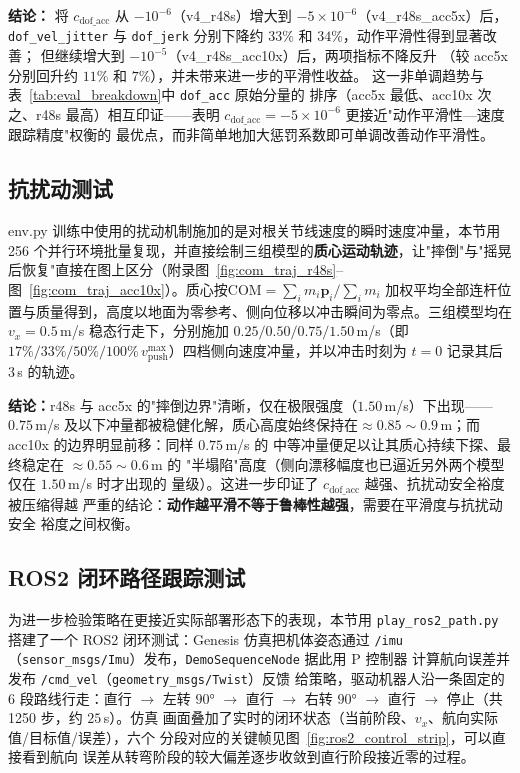 \documentclass[12pt, a4paper]{article}
\begin{document}
\textbf{结论：} 将 $c_\text{dof\_acc}$ 从 $-10^{-6}$（v4\_r48s）增大到
$-5\times10^{-6}$（v4\_r48s\_acc5x）后，\texttt{dof\_vel\_jitter} 与
\texttt{dof\_jerk} 分别下降约 $33\%$ 和 $34\%$，动作平滑性得到显著改善；
但继续增大到 $-10^{-5}$（v4\_r48s\_acc10x）后，两项指标不降反升
（较 acc5x 分别回升约 $11\%$ 和 $7\%$），并未带来进一步的平滑性收益。
这一非单调趋势与表~\ref{tab:eval_breakdown}中 \texttt{dof\_acc} 原始分量的
排序（acc5x 最低、acc10x 次之、r48s 最高）相互印证——表明
$c_\text{dof\_acc} = -5\times10^{-6}$ 更接近"动作平滑性—速度跟踪精度"权衡的
最优点，而非简单地加大惩罚系数即可单调改善动作平滑性。

\subsection{抗扰动测试}

env.py 训练中使用的扰动机制施加的是对根关节线速度的瞬时速度冲量，本节用 256
个并行环境批量复现，并直接绘制三组模型的\textbf{质心运动轨迹}，让"摔倒"与"摇晃后恢复"直接在图上区分（附录图~\ref{fig:com_traj_r48s}--图~\ref{fig:com_traj_acc10x}）。质心按$\text{COM} = \sum_i m_i \mathbf{p}_i / \sum_i m_i$ 加权平均全部连杆位置与质量得到，高度以地面为零参考、侧向位移以冲击瞬间为零点。三组模型均在$v_x = 0.5$\,m/s 稳态行走下，分别施加 $0.25/0.50/0.75/1.50$\,m/s（即$17\%/33\%/50\%/100\%\,v_\text{push}^\text{max}$）四档侧向速度冲量，并以冲击时刻为 $t=0$ 记录其后 $3$\,s 的轨迹。

\textbf{结论：}r48s 与 acc5x 的"摔倒边界"清晰，仅在极限强度（$1.50$\,m/s）下出现——$0.75$\,m/s 及以下冲量都被稳健化解，质心高度始终保持在$\approx 0.85\sim0.9$\,m；而 acc10x 的边界明显前移：同样 $0.75$\,m/s 的
中等冲量便足以让其质心持续下探、最终稳定在 $\approx 0.55\sim0.6$\,m 的
"半塌陷"高度（侧向漂移幅度也已逼近另外两个模型仅在 $1.50$\,m/s 时才出现的
量级）。这进一步印证了 $c_\text{dof\_acc}$ 越强、抗扰动安全裕度被压缩得越
严重的结论：\textbf{动作越平滑不等于鲁棒性越强}，需要在平滑度与抗扰动安全
裕度之间权衡。

\subsection{ROS2 闭环路径跟踪测试}

为进一步检验策略在更接近实际部署形态下的表现，本节用 \texttt{play\_ros2\_path.py}
搭建了一个 ROS2 闭环测试：Genesis 仿真把机体姿态通过 \texttt{/imu}
（\texttt{sensor\_msgs/Imu}）发布，\texttt{DemoSequenceNode} 据此用 P 控制器
计算航向误差并发布 \texttt{/cmd\_vel}（\texttt{geometry\_msgs/Twist}）反馈
给策略，驱动机器人沿一条固定的 6 段路线行走：直行 $\to$ 左转 $90°$ $\to$
直行 $\to$ 右转 $90°$ $\to$ 直行 $\to$ 停止（共 1250 步，约 $25$\,s）。仿真
画面叠加了实时的闭环状态（当前阶段、$v_x$、航向实际值/目标值/误差），六个
分段对应的关键帧见图~\ref{fig:ros2_control_strip}，可以直接看到航向
误差从转弯阶段的较大偏差逐步收敛到直行阶段接近零的过程。
\end{document}
